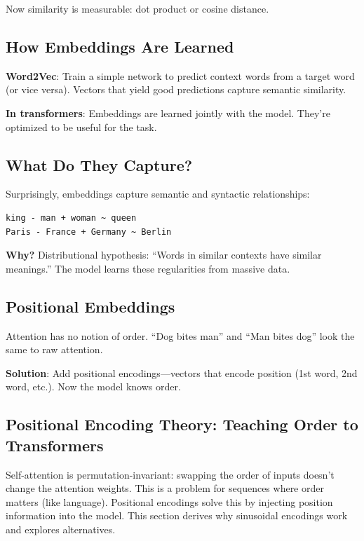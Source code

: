 Now similarity is measurable: dot product or cosine distance.

\subsection{How Embeddings Are Learned}

\textbf{Word2Vec}: Train a simple network to predict context words from a target word (or vice versa). Vectors that yield good predictions capture semantic similarity.

\textbf{In transformers}: Embeddings are learned jointly with the model. They're optimized to be useful for the task.

\subsection{What Do They Capture?}

Surprisingly, embeddings capture semantic and syntactic relationships:

\begin{verbatim}
king - man + woman ~ queen
Paris - France + Germany ~ Berlin
\end{verbatim}

\textbf{Why?} Distributional hypothesis: ``Words in similar contexts have similar meanings.'' The model learns these regularities from massive data.

\subsection{Positional Embeddings}

Attention has no notion of order. ``Dog bites man'' and ``Man bites dog'' look the same to raw attention.

\textbf{Solution}: Add positional encodings---vectors that encode position (1st word, 2nd word, etc.). Now the model knows order.

\subsection{Positional Encoding Theory: Teaching Order to Transformers}

Self-attention is permutation-invariant: swapping the order of inputs doesn't change the attention weights. This is a problem for sequences where order matters (like language). Positional encodings solve this by injecting position information into the model. This section derives why sinusoidal encodings work and explores alternatives.


